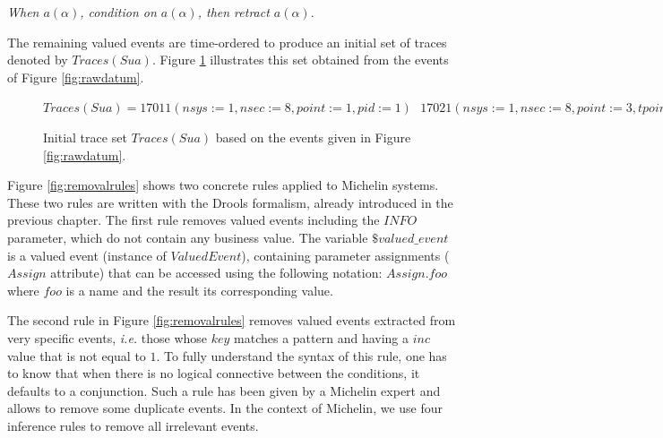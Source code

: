 \textit{When $a(\alpha)$, condition on $a(\alpha)$, then
retract $a(\alpha)$}.

\begin{example}
The remaining valued events are time-ordered to produce an
initial set of traces denoted by $Traces(Sua)$. Figure
\ref{fig:tsua} illustrates this set obtained from the events of
Figure \ref{fig:rawdatum}.

\begin{figure}[ht]
\begin{framed}
    $Traces(Sua) =
    17011(nsys:=1, nsec:=8, point:=1, pid:=1)\text{ }
    17021(nsys:=1, nsec:=8, point:=3, tpoint:=8, pid:=1)\text{ }
    17011(nsys:=1, nsec:=8, point:=2, pid:=2)\text{ }
    17021(nsys:=1, nsec:=8, point:=4, tpoint:=9, pid:=2)$
\end{framed}

\caption{Initial trace set $Traces(Sua)$ based on the events
given in Figure \ref{fig:rawdatum}.}
\label{fig:tsua}
\end{figure}
\end{example}

Figure \ref{fig:removalrules} shows two concrete rules applied to
Michelin systems. These two rules are written with the Drools
formalism, already introduced in the previous chapter. The first
rule removes valued events including the $INFO$ parameter,
which do not contain any business value. The variable
$\$valued\_event$ is a valued event (instance of $ValuedEvent$),
containing parameter assignments ($Assign$ attribute) that can be
accessed using the following notation: $Assign.foo$ where $foo$
is a name and the result its corresponding value.

The second rule in Figure \ref{fig:removalrules} removes valued
events extracted from very specific events, \emph{i.e.} those
whose $key$ matches a pattern and having a $inc$ value that is
not equal to $1$.  To fully understand the syntax of this rule,
one has to know that when there is no logical connective between
the conditions, it defaults to a conjunction.  Such a rule has
been given by a Michelin expert and allows to remove some
duplicate events.  In the context of Michelin, we use four
inference rules to remove all irrelevant events.

